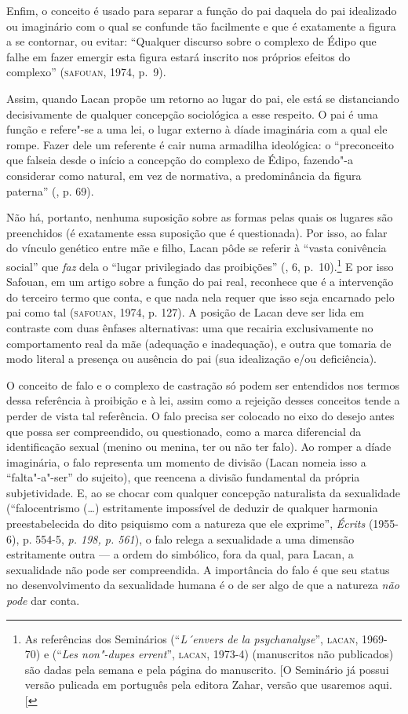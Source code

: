 Enfim, o conceito é usado para separar a função do pai daquela do pai
idealizado ou imaginário com o qual se confunde tão facilmente e que é
exatamente a figura a se contornar, ou evitar: ``Qualquer discurso sobre
o complexo de Édipo que falhe em fazer emergir esta figura estará
inscrito nos próprios efeitos do complexo'' (\textsc{safouan}, 1974, p.~9).

Assim, quando Lacan propõe um retorno ao lugar do pai, ele está se
distanciando decisivamente de qualquer concepção sociológica a esse
respeito. O pai é uma função e refere"-se a uma lei, o lugar externo à
díade imaginária com a qual ele rompe. Fazer dele um referente é cair
numa armadilha ideológica: o ``preconceito que falseia desde o início a
concepção do complexo de Édipo, fazendo"-a considerar como natural, em
vez de normativa, a predominância da figura paterna'' (, p. 69).

Não há, portanto, nenhuma suposição sobre as formas pelas quais os
lugares são preenchidos (é exatamente essa suposição que é questionada).
Por isso, ao falar do vínculo genético entre mãe e filho, Lacan pôde se
referir à ``vasta conivência social'' que \emph{faz} dela o ``lugar
privilegiado das proibições'' (, 6, p.~10).\footnote{As referências
  dos Seminários  (``\emph{L´envers de la psychanalyse}'', \textsc{lacan},
  1969-70) e  (``\emph{Les non"-dupes errent}'', \textsc{lacan}, 1973-4)
  (manuscritos não publicados) são dadas pela semana e pela página do
  manuscrito. {[}O Seminário  já possui versão pulicada em
  português pela editora Zahar, versão que usaremos aqui. {[}\versal{N.~T.}{]}} E por
isso Safouan, em um artigo sobre a função do pai real, reconhece que é a
intervenção do terceiro termo que conta, e que nada nela requer que isso
seja encarnado pelo pai como tal (\textsc{safouan}, 1974, p. 127). A posição de
Lacan deve ser lida em contraste com duas ênfases alternativas: uma que
recairia exclusivamente no comportamento real da mãe (adequação e
inadequação), e outra que tomaria de modo literal a presença ou ausência
do pai (sua idealização e/ou deficiência).

O conceito de falo e o complexo de castração só podem ser entendidos nos
termos dessa referência à proibição e à lei, assim como a rejeição
desses conceitos tende a perder de vista tal referência. O falo precisa
ser colocado no eixo do desejo antes que possa ser compreendido, ou
questionado, como a marca diferencial da identificação sexual (menino ou
menina, ter ou não ter falo). Ao romper a díade imaginária, o falo
representa um momento de divisão (Lacan nomeia isso a ``falta"-a"-ser'' do
sujeito), que reencena a divisão fundamental da própria subjetividade.
E, ao se chocar com qualquer concepção naturalista da sexualidade
(``falocentrismo (\ldots{}) estritamente impossível de deduzir de qualquer
harmonia preestabelecida do dito psiquismo com a natureza que ele
exprime'', \emph{Écrits} (1955-6), p. 554-5, \emph{p. 198, p. 561}), o
falo relega a sexualidade a uma dimensão estritamente outra --- a ordem
do simbólico, fora da qual, para Lacan, a sexualidade não pode ser
compreendida. A importância do falo é que seu status no desenvolvimento
da sexualidade humana é o de ser algo de que a natureza \emph{não pode}
dar conta.

